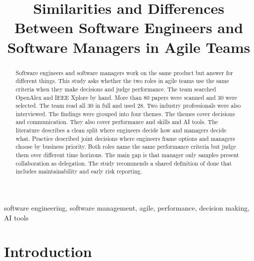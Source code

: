 \documentclass[conference]{IEEEtran}
\begin{document}
\title{Similarities and Differences Between Software Engineers and Software Managers in Agile Teams}
\author{
\and
{}
\and
{}
\and
{}
\and
{}
}
\maketitle
\begin{abstract}
Software engineers and software managers work on the same product but answer for different things. This study asks whether the two roles in agile teams use the same criteria when they make decisions and judge performance. The team searched OpenAlex and IEEE Xplore by hand. More than 80 papers were scanned and 30 were selected. The team read all 30 in full and used 28. Two industry professionals were also interviewed. The findings were grouped into four themes. The themes cover decisions and communication. They also cover performance and skills and AI tools. The literature describes a clean split where engineers decide how and managers decide what. Practice described joint decisions where engineers frame options and managers choose by business priority. Both roles name the same performance criteria but judge them over different time horizons. The main gap is that manager only samples present collaboration as delegation. The study recommends a shared definition of done that includes maintainability and early risk reporting.
\end{abstract}
\begin{IEEEkeywords}
software engineering, software management, agile, performance, decision making, AI tools
\end{IEEEkeywords}

\section{Introduction}
\end{document}
